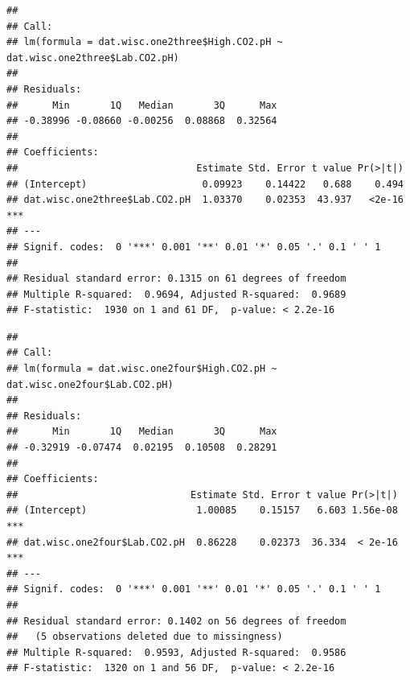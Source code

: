 \documentclass[]{article}
\newenvironment{Shaded}{\begin{snugshade}}{\end{snugshade}}
\newcommand{\KeywordTok}[1]{\textcolor[rgb]{0.13,0.29,0.53}{\textbf{#1}}}
\newcommand{\NormalTok}[1]{#1}
\newcommand{\OperatorTok}[1]{\textcolor[rgb]{0.81,0.36,0.00}{\textbf{#1}}}
\newcommand{\StringTok}[1]{\textcolor[rgb]{0.31,0.60,0.02}{#1}}
\begin{document}
\begin{verbatim}
## 
## Call:
## lm(formula = dat.wisc.one2three$High.CO2.pH ~ dat.wisc.one2three$Lab.CO2.pH)
## 
## Residuals:
##      Min       1Q   Median       3Q      Max 
## -0.38996 -0.08660 -0.00256  0.08868  0.32564 
## 
## Coefficients:
##                               Estimate Std. Error t value Pr(>|t|)    
## (Intercept)                    0.09923    0.14422   0.688    0.494    
## dat.wisc.one2three$Lab.CO2.pH  1.03370    0.02353  43.937   <2e-16 ***
## ---
## Signif. codes:  0 '***' 0.001 '**' 0.01 '*' 0.05 '.' 0.1 ' ' 1
## 
## Residual standard error: 0.1315 on 61 degrees of freedom
## Multiple R-squared:  0.9694, Adjusted R-squared:  0.9689 
## F-statistic:  1930 on 1 and 61 DF,  p-value: < 2.2e-16
\end{verbatim}

\begin{Shaded}
\end{Shaded}

\begin{verbatim}
## 
## Call:
## lm(formula = dat.wisc.one2four$High.CO2.pH ~ dat.wisc.one2four$Lab.CO2.pH)
## 
## Residuals:
##      Min       1Q   Median       3Q      Max 
## -0.32919 -0.07474  0.02195  0.10508  0.28291 
## 
## Coefficients:
##                              Estimate Std. Error t value Pr(>|t|)    
## (Intercept)                   1.00085    0.15157   6.603 1.56e-08 ***
## dat.wisc.one2four$Lab.CO2.pH  0.86228    0.02373  36.334  < 2e-16 ***
## ---
## Signif. codes:  0 '***' 0.001 '**' 0.01 '*' 0.05 '.' 0.1 ' ' 1
## 
## Residual standard error: 0.1402 on 56 degrees of freedom
##   (5 observations deleted due to missingness)
## Multiple R-squared:  0.9593, Adjusted R-squared:  0.9586 
## F-statistic:  1320 on 1 and 56 DF,  p-value: < 2.2e-16
\end{verbatim}
\end{document}
